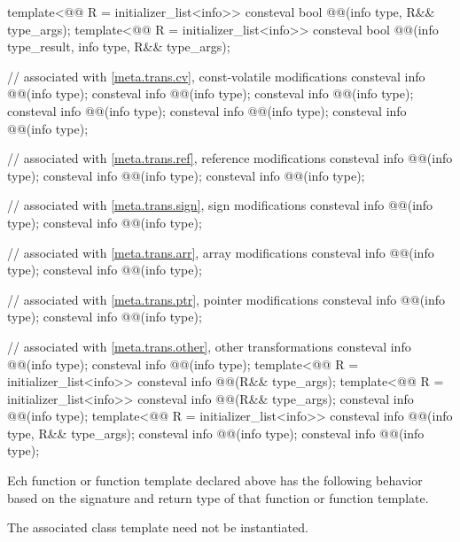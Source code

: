 \begin{codeblock}
template<@@ R = initializer_list<info>>
  consteval bool @@(info type, R&& type_args);
template<@@ R = initializer_list<info>>
  consteval bool @@(info type_result, info type, R&& type_args);

// associated with \ref{meta.trans.cv}, const-volatile modifications
consteval info @@(info type);
consteval info @@(info type);
consteval info @@(info type);
consteval info @@(info type);
consteval info @@(info type);
consteval info @@(info type);

// associated with \ref{meta.trans.ref}, reference modifications
consteval info @@(info type);
consteval info @@(info type);
consteval info @@(info type);

// associated with \ref{meta.trans.sign}, sign modifications
consteval info @@(info type);
consteval info @@(info type);

// associated with \ref{meta.trans.arr}, array modifications
consteval info @@(info type);
consteval info @@(info type);

// associated with \ref{meta.trans.ptr}, pointer modifications
consteval info @@(info type);
consteval info @@(info type);

// associated with \ref{meta.trans.other}, other transformations
consteval info @@(info type);
consteval info @@(info type);
template<@@ R = initializer_list<info>>
  consteval info @@(R&& type_args);
template<@@ R = initializer_list<info>>
  consteval info @@(R&& type_args);
consteval info @@(info type);
template<@@ R = initializer_list<info>>
  consteval info @@(info type, R&& type_args);
consteval info @@(info type);
consteval info @@(info type);
\end{codeblock}

\pnum
Ech function or function template declared above has the following behavior
based on the signature and return type of that function or function template.
\begin{note}
The associated class template need not be instantiated.
\end{note}


